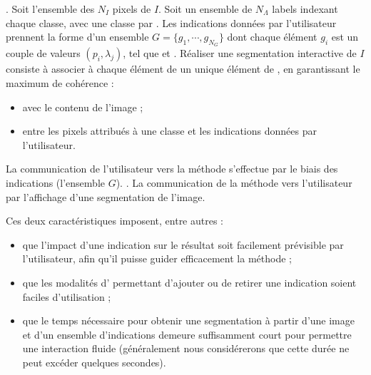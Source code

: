 .  Soit  l'ensemble des $N_{I}$ pixels de $I$. Soit  un ensemble de $N_{\Lambda}$ labels indexant chaque classe, avec une classe par  .  Les indications données par l'utilisateur prennent la forme d'un ensemble  $G= \lbrace g_{1}, \cdots, g_{N_{G}} \rbrace$ dont chaque élément $g_{i}$ est un couple de valeurs $(p_{i},\lambda_{j})$, tel que   et . Réaliser une segmentation interactive de $I$ consiste à associer à chaque élément de  un unique élément de \modif{$\Lambda$}, en garantissant le maximum de cohérence :
\begin{itemize}
\item avec le contenu de l'image ;
\item entre les pixels attribués à une classe et les indications données par l'utilisateur.
\end{itemize}

La communication de l'utilisateur vers la méthode s'effectue par le biais des indications (l'ensemble $G$). . La communication de la méthode vers l'utilisateur  par l'affichage d'une segmentation de l'image.

Ces deux caractéristiques imposent, entre autres : 
\begin{itemize}
\item que l'impact d'une indication sur le résultat soit facilement prévisible par l'utilisateur, afin qu'il puisse guider efficacement la méthode ;
\item que les modalités d' permettant d'ajouter ou de retirer une indication soient faciles d'utilisation ;
\item que le temps nécessaire pour obtenir une segmentation à partir d'une image et d'un ensemble d'indications demeure suffisamment court pour permettre une interaction fluide (généralement nous considérerons que cette durée ne peut excéder quelques secondes).
\end{itemize}

